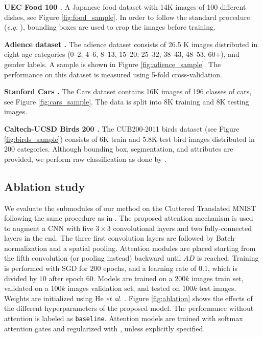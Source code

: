 \documentclass[runningheads]{llncs}
\begin{document}
\medskip
\noindent\textbf{UEC Food 100 \cite{matsuda12}.} A Japanese food dataset with 14K images of 100 different dishes, see Figure \ref{fig:food_sample}. In order to follow the standard procedure (\emph{e.g.}  \cite{chen2016deep,hassannejad2016food}), bounding boxes are used to crop the images before training.

\medskip
\noindent\textbf{Adience dataset \cite{eidinger2014age}.} The adience dataset consists of 26.5 K images distributed in eight age categories (0–2, 4–6, 8–13, 15–20, 25–32, 38–43, 48–53, 60+), and gender labels. A sample is shown in Figure \ref{fig:adience_sample}.
The performance on this dataset is measured using 5-fold cross-validation.

\medskip
\noindent\textbf{Stanford Cars \cite{krause20133d}.}
The Cars dataset contains 16K images of 196 classes of cars, see Figure \ref{fig:cars_sample}. The data is split into 8K training and 8K testing images.

\medskip
\noindent\textbf{Caltech-UCSD Birds 200 \cite{WahCUB_200_2011}.}
The CUB200-2011 birds dataset (see Figure \ref{fig:birds_sample}) consists of 6K train and 5.8K test bird images distributed in 200 categories. Although bounding box, segmentation, and attributes are provided, we perform raw classification as done by \cite{jaderberg2015spatial}. 

\subsection{Ablation study}
\label{sect:ablation}
We evaluate the submodules of our method on the Cluttered Translated MNIST following the same procedure as in \cite{mnih2014recurrent}. The proposed attention mechanism is used to augment a CNN with five $3\times 3$ convolutional layers and two fully-connected layers in the end. The three first convolution layers are followed by Batch-normalization and a spatial pooling. Attention modules are placed starting from the fifth convolution (or pooling instead) backward until $AD$ is reached. Training is performed with SGD for $200$ epochs, and a learning rate of $0.1$, which is divided by $10$ after epoch $60$. Models are trained on a $200k$ images train set, validated on a $100k$ images validation set, and tested on $100k$ test images. Weights are initialized using He \emph{et al.}  \cite{he2015delving}. Figure \ref{fig:ablation} shows the effects of the different hyperparameters of the proposed model. The performance without attention is labeled as \texttt{baseline}. Attention models are trained with softmax attention gates and regularized with \cite{zhao2017diversified}, unless explicitly specified.
\end{document}
